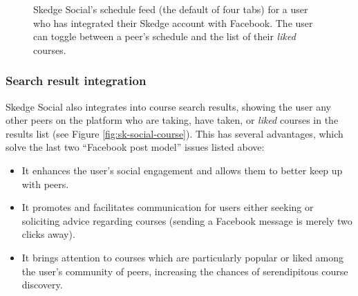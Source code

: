     \begin{figure}
      \centering
      \caption[Skedge Social's schedule feed]{Skedge Social's schedule feed (the default of four tabs) for a user who has integrated their Skedge account with Facebook. The user can toggle between a peer's schedule and the list of their \emph{liked} courses.} \label{fig:sk-feed}
    \end{figure}
  
  \subsubsection{Search result integration}

  Skedge Social also integrates into course search results, showing the user any other peers on the platform who are taking, have taken, or \emph{liked} courses in the results list (see Figure \ref{fig:sk-social-course}). This has several advantages, which solve the last two ``Facebook post model'' issues listed above:

  \begin{itemize}

  \item It enhances the user's social engagement and allows them to better keep up with peers.
  \item It promotes and facilitates communication for users either seeking or soliciting advice regarding courses (sending a Facebook message is merely two clicks away).
  \item It brings attention to courses which are particularly popular or liked among the user's community of peers, increasing the chances of serendipitous course discovery.

  \end{itemize}

